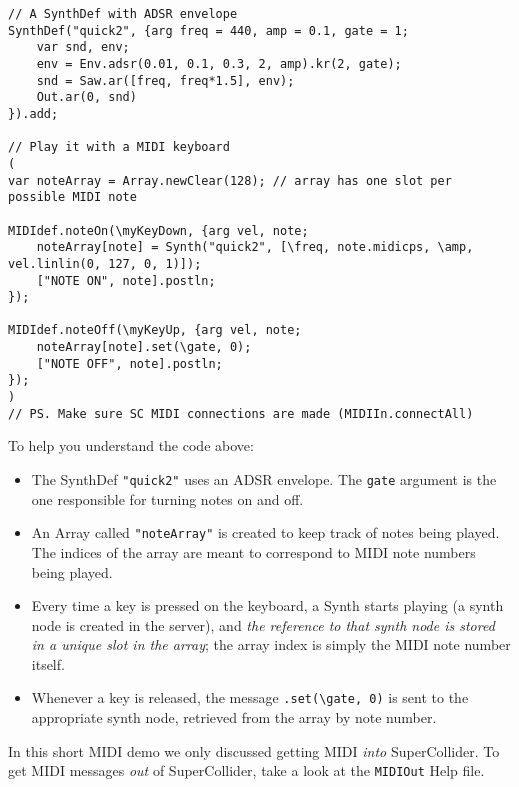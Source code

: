 \begin{lstlisting}[style=SuperCollider-IDE, basicstyle=\scttfamily\footnotesize]
 // A SynthDef with ADSR envelope
SynthDef("quick2", {arg freq = 440, amp = 0.1, gate = 1;
	var snd, env;
	env = Env.adsr(0.01, 0.1, 0.3, 2, amp).kr(2, gate);
	snd = Saw.ar([freq, freq*1.5], env);	
	Out.ar(0, snd)
}).add;

// Play it with a MIDI keyboard
(
var noteArray = Array.newClear(128); // array has one slot per possible MIDI note

MIDIdef.noteOn(\myKeyDown, {arg vel, note;
	noteArray[note] = Synth("quick2", [\freq, note.midicps, \amp, vel.linlin(0, 127, 0, 1)]);
	["NOTE ON", note].postln;
});
	
MIDIdef.noteOff(\myKeyUp, {arg vel, note;
	noteArray[note].set(\gate, 0);
	["NOTE OFF", note].postln;
});
)
// PS. Make sure SC MIDI connections are made (MIDIIn.connectAll)
 \end{lstlisting} 
 
To help you understand the code above:

\begin{itemize}
\item The SynthDef \texttt{"quick2"} uses an ADSR envelope. The \texttt{gate} argument is the one responsible for turning notes on and off.
\item An Array called \texttt{"noteArray"} is created to keep track of notes being played. The indices of the array are meant to correspond to MIDI note numbers being played.
\item Every time a key is pressed on the keyboard, a Synth starts playing (a synth node is created in the server), and \emph{the reference to that synth node is stored in a unique slot in the array}; the array index is simply the MIDI note number itself.
\item Whenever a key is released, the message \texttt{.set(\textbackslash gate, 0)} is sent to the appropriate synth node, retrieved from the array by note number.
\end{itemize}

In this short MIDI demo we only discussed getting MIDI \emph{into} SuperCollider. To get MIDI messages \emph{out} of SuperCollider, take a look at the \texttt{MIDIOut} Help file.